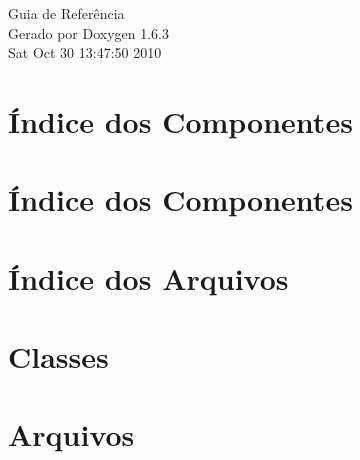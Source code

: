 \documentclass[a4paper]{book}
\begin{document}
\hypersetup{pageanchor=false}
\begin{titlepage}
\vspace*{7cm}
\begin{center}
{\Large Guia de Referência}\\
\vspace*{1cm}
{\large Gerado por Doxygen 1.6.3}\\
\vspace*{0.5cm}
{\small Sat Oct 30 13:47:50 2010}\\
\end{center}
\end{titlepage}
\clearemptydoublepage
{}
\tableofcontents
\clearemptydoublepage
{}
\hypersetup{pageanchor=true}
\chapter{Índice dos Componentes}

\chapter{Índice dos Componentes}

\chapter{Índice dos Arquivos}

\chapter{Classes}

















\chapter{Arquivos}














\printindex
\end{document}
